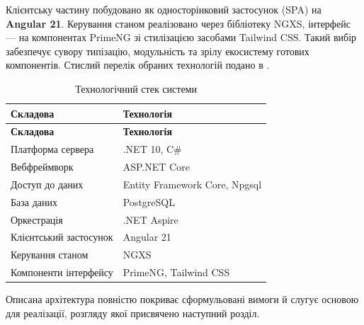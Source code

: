 Клієнтську частину побудовано як односторінковий застосунок (SPA) на \textbf{Angular 21}. Керування станом реалізовано через бібліотеку NGXS, інтерфейс — на компонентах PrimeNG зі стилізацією засобами Tailwind CSS. Такий вибір забезпечує сувору типізацію, модульність та зрілу екосистему готових компонентів. Стислий перелік обраних технологій подано в .

\needspace{6.5cm}
\begin{spacing}{1.2}
    \footnotesize
    \noindent
    \begin{xltabular}{\textwidth}{| >{\raggedright\arraybackslash}X | >{\raggedright\arraybackslash}X |}
        \caption{Технологічний стек системи} \label{tab:stack} \\
        \hline
        \textbf{Складова} & \textbf{Технологія} \\ \hline
        \endfirsthead

        \hline
        \textbf{Складова} & \textbf{Технологія} \\ \hline
        \endhead

        Платформа сервера & .NET 10, C\# \\ \hline
        Вебфреймворк & ASP.NET Core \\ \hline
        Доступ до даних & Entity Framework Core, Npgsql \\ \hline
        База даних & PostgreSQL \\ \hline
        Оркестрація & .NET Aspire \\ \hline
        Клієнтський застосунок & Angular 21 \\ \hline
        Керування станом & NGXS \\ \hline
        Компоненти інтерфейсу & PrimeNG, Tailwind CSS \\ \hline
    \end{xltabular}
\end{spacing}

Описана архітектура повністю покриває сформульовані вимоги й слугує основою для реалізації, розгляду якої присвячено наступний розділ.
